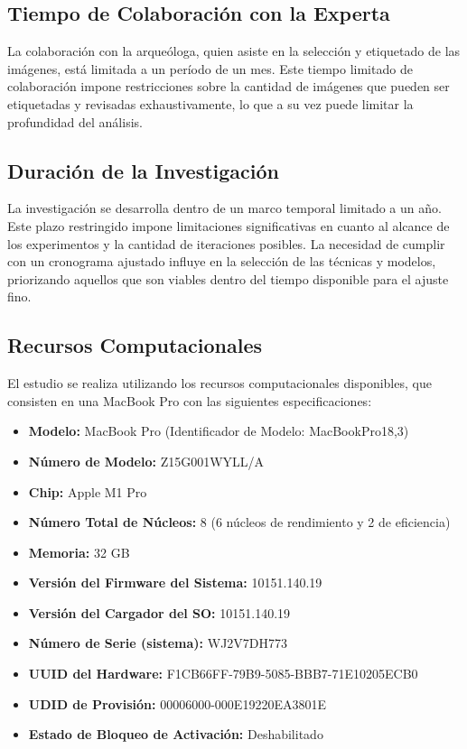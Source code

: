 \subsection{Tiempo de Colaboración con la Experta}
La colaboración con la arqueóloga, quien asiste en la selección y etiquetado de las imágenes, está limitada a un período de un mes. Este tiempo limitado de colaboración impone restricciones sobre la cantidad de imágenes que pueden ser etiquetadas y revisadas exhaustivamente, lo que a su vez puede limitar la profundidad del análisis.

\subsection{Duración de la Investigación}
La investigación se desarrolla dentro de un marco temporal limitado a un año. Este plazo restringido impone limitaciones significativas en cuanto al alcance de los experimentos y la cantidad de iteraciones posibles. La necesidad de cumplir con un cronograma ajustado influye en la selección de las técnicas y modelos, priorizando aquellos que son viables dentro del tiempo disponible para el ajuste fino.

\subsection{Recursos Computacionales}
El estudio se realiza utilizando los recursos computacionales disponibles, que consisten en una MacBook Pro con las siguientes especificaciones:

\begin{itemize}
    \item \textbf{Modelo:} MacBook Pro (Identificador de Modelo: MacBookPro18,3)
    \item \textbf{Número de Modelo:} Z15G001WYLL/A
    \item \textbf{Chip:} Apple M1 Pro
    \item \textbf{Número Total de Núcleos:} 8 (6 núcleos de rendimiento y 2 de eficiencia)
    \item \textbf{Memoria:} 32 GB
    \item \textbf{Versión del Firmware del Sistema:} 10151.140.19
    \item \textbf{Versión del Cargador del SO:} 10151.140.19
    \item \textbf{Número de Serie (sistema):} WJ2V7DH773
    \item \textbf{UUID del Hardware:} F1CB66FF-79B9-5085-BBB7-71E10205ECB0
    \item \textbf{UDID de Provisión:} 00006000-000E19220EA3801E
    \item \textbf{Estado de Bloqueo de Activación:} Deshabilitado
\end{itemize}

